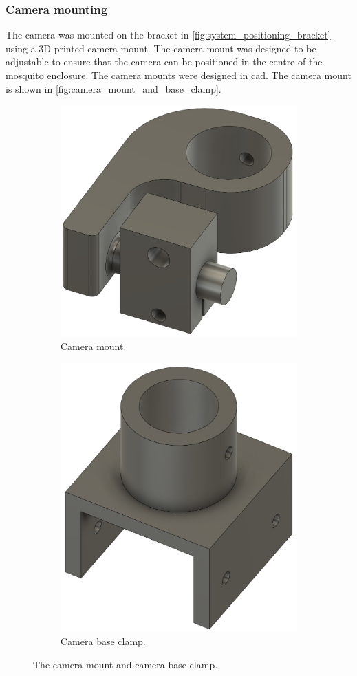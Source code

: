 \subsubsection{Camera mounting}
The camera was mounted on the bracket in \autoref{fig:system_positioning_bracket} using a 3D printed camera mount. The camera mount was designed to be adjustable to ensure that the camera can be positioned in the centre of the mosquito enclosure. The camera mounts were designed in \gls{cad}. The camera mount is shown in \autoref{fig:camera_mount_and_base_clamp}.
\begin{figure}[!htb]
  \centering
  \begin{subfigure}[b]{0.45\textwidth}
    \centering
    \includegraphics[width=0.7\linewidth]{figures/hardware_design/camera_and_middle_clamp.png}
    \caption{Camera mount.}
    \label{fig:camera_mount}
  \end{subfigure}
  \quad
  \begin{subfigure}[b]{0.45\textwidth}
    \centering
    \includegraphics[width=0.7\linewidth]{figures/hardware_design/camera_base_clamp.png}
    \caption{Camera base clamp.}
    \label{fig:camera_base_clamp}
  \end{subfigure}
  \caption{The camera mount and camera base clamp.}
  \label{fig:camera_mount_and_base_clamp}
\end{figure}



